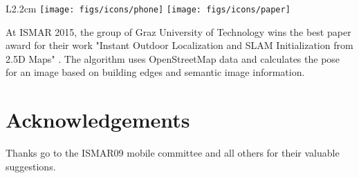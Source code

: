 \documentclass[12pt,a4paper]{article}
\begin{document}
\vspace{0.20in}

\begin{wrapfigure}{L}{2.2cm}	
	\vspace{-15pt}	
	\texttt{[image: figs/icons/phone]}
	\texttt{[image: figs/icons/paper]}
	\vspace{-10pt}		
\end{wrapfigure} 
\noindent At ISMAR 2015, the group of Graz University of Technology wins the best paper award for their work "Instant Outdoor Localization and {SLAM} Initialization from 2.5D Maps" \cite{ArthPVSL15}. The algorithm uses OpenStreetMap data and calculates the pose for an image based on building edges and semantic image information. 

\section*{Acknowledgements}

Thanks go to the ISMAR09 mobile committee and all others for their valuable suggestions.



\parskip=0pt
\parsep=0pt




\parskip=0pt
\parsep=0pt

\end{document}

